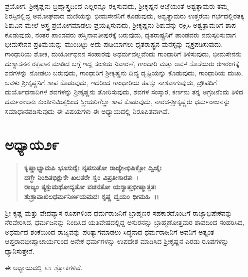 ಪ್ರಯೋಗ, ಶ‍್ರೀಕೃಷ್ಣನು ಬ್ರಹ್ಮಾಸ್ತ್ರದಿಂದ ಎಲ್ಲರನ್ನೂ ರಕ್ಷಿಸುವುದು, ಶ‍್ರೀಕೃಷ್ಣನ ಆಜ್ಞೆಯಂತೆ ಅಶ್ವತ್ಥಾಮರು ತಮ್ಮ ಶಿರಸ್ಸಿನಲ್ಲಿದ್ದ ಅಮೋಘವಾದ ಮಣಿಯನ್ನು ಭೀಮಸೇನನಿಗೆ ಕೊಡುವುದು, ಅಶ್ವತ್ಥಾಮರು ಉತ್ತರೆಯ ಗರ್ಭದಲ್ಲಿರತಕ್ಕ ಶಿಶುವಿನ ಮೇಲೆ ಅಸ್ತ್ರ ಪ್ರಯೋಗಮಾಡಲು ಪ್ರಯತ್ನಿಸುವುದು, ಶ‍್ರೀಕೃಷ್ಣನು ಶಿಶುವನ್ನು ರಕ್ಷಿಸಿ ಅಶ್ವತ್ಥಾಮರಿಗೆ ಶಾಪ ಕೊಡುವುದು, ನಂತರ ಪಾಂಡವರು ಹಸ್ತಿನಾವತೀಪುರಕ್ಕೆ ಬರುವುದು, ಧೃತರಾಷ್ಟ್ರನಿಗೆ ಪಾಂಡವರು ನಮಸ್ಕರಿಸುವಾಗ ಭೀಮಸೇನನ ಪ್ರತಿಮೆಯನ್ನು ಮುಂದಿಟ್ಟು ಅದು ಪುಡಿಯಾಗಲು ಧೃತರಾಷ್ಟ್ರನ ಮನಸ್ಸನ್ನು ವ್ಯಕ್ತಪಡಿಸುವುದು, ಗಾಂಧಾರಿಯ ಶೋಕ, ದುರ್ಯೋಧನನ ಸಂಹಾರವು ಅಧರ್ಮವಲ್ಲವೆಂದು ಗಾಂಧಾರಿಗೆ ತಿಳಿಸುವುದು, ಭೀಮಸೇನನು ದುಶ್ಯಾಸನನ ರಕ್ತಪಾನ ಮಾಡಿದ ಬಗ್ಗೆ ಇದ್ದ ಸಂಶಯ ನಿವಾರಣೆ, ಗಾಂಧಾರಿ ಮತ್ತು ಅವಳ ಸೊಸೆಯರು ರಣರಂಗಕ್ಕೆ ಶವಗಳನ್ನು ನೋಡಲು ಬರುವುದು, ಗಾಂಧಾರಿಗೆ ಶ‍್ರೀಕೃಷ್ಣನು ದಿವ್ಯ ದೃಷ್ಟಿಯನ್ನು ಕೊಡುವುದು, ಗಾಂಧಾರಿಯ ದುಃಖ, ಅವಳು ಶ‍್ರೀಕೃಷ್ಣನಿಗೆ ಶಾಪ ಕೊಡುವುದು, ಇದರಿಂದ ಗಾಂಧಾರಿಯ ತಪಸ್ಸು ನಾಶವಾಗುವುದು, ದ್ರೌಪದಿಗೆ ದುರ್ಯೊಧನಾದಿಗಳ ಶವಗಳನ್ನು ಶ‍್ರೀಕೃಷ್ಣನು ತೋರಿಸುವುದು, ಶವಗಳ ಸಂಸ್ಕಾರ, ಕರ್ಣನು ತನ್ನ ಅಗ್ರಜನೆಂದು ತಿಳಿದ ಧರ್ಮರಾಜನು ಕುಂತೀನಿಮಿತ್ತದಿಂದ ಸ್ತ್ರೀಯರಿಗೆಲ್ಲಾ ಶಾಪ ಕೊಡುವುದು, ನಾರದ-ಶ‍್ರೀಕೃಷ್ಣರು ಧರ್ಮರಾಜನನ್ನು ಸಮಾಧಾನಪಡಿಸುವುದು ಈ ವಿಷಯಗಳು ಈ ಅಧ್ಯಾಯದಲ್ಲಿ ನಿರೂಪಿತವಾಗಿವೆ.


\section*{ಅಧ್ಯಾಯ\enginline{-}೨೯}

\begin{verse}
\textbf{ಕೃಷ್ಣಾಭ್ಯಾಮಪಿ ಭೂಸುರೈಃ ನೃಪಸುತೋ ರಾಜ್ಯೇsಭಿಷಿಕ್ತೋ ದ್ವಿಜೈಃ}\\\textbf{ದಗ್ಧೇ ನಿಂದಿತಭಿಕ್ಷುಕೇ ಖಲತರೇ ಸ್ವಂ ವಿಪ್ರತೀಸಾರತಃ~।}\\\textbf{ರಾಜ್ಯಂ ತ್ಯಕ್ತುಮಥೋದ್ಯತೋ ವಚನತೋ ಯಸ್ಯಾಪ್ತಭೀಷ್ಮಾತ್ತತಃ }\\\textbf{ಶುಶ್ರಾವಾಖಿಲಧರ್ಮನಿರ್ಣಯಮದಃ ಕೃಷ್ಣ ದ್ವಯಂ ಧೀಮಹಿ~।।}
\end{verse}

ಶ‍್ರೀ ಕೃಷ್ಣ ಮತ್ತು ವೇದವ್ಯಾಸ ರೂಪಗಳಿಂದ ಧರ್ಮರಾಜನಿಗೆ ಬ್ರಾಹ್ಮಣರ ಸಹಕಾರ\-ದೊಂದಿಗೆ ರಾಜ್ಯಾಭಿಷೇಕವನ್ನು ನೆರವೇರಿಸಿದ, ಧರ್ಮಜನನ್ನು ನಿಂದಿಸಿದ ಯತಿವೇಷದಲ್ಲಿದ್ದ ಅಸುರನನ್ನು ಬ್ರಾಹ್ಮಣೋತ್ತಮರ ಶಾಪದಿಂದ ಸಂಹರಿಸಿದ, ಅಧರ್ಮದ ಶಂಕೆಯಿಂದ ರಾಜ್ಯವನ್ನು ಪರಿತ್ಯಾಗಮಾಡಲು ಸಿದ್ಧನಾದ ಧರ್ಮರಾಜನಿಗೆ ಅವನಿಗೆ ಅತ್ಯಂತ ಆಪ್ತರಾದ\break ಭೀಷ್ಮಾಚಾರ್ಯರಿಂದ ಅನೇಕ ಧರ್ಮಗಳನ್ನು ಉಪದೇಶ ಮಾಡಿಸಿದ ಶ‍್ರೀಕೃಷ್ಣನ ಎರಡು ರೂಪಗಳನ್ನು ಧ್ಯಾನಿಸುತ್ತೇನೆ.

ಈ ಅಧ್ಯಾಯದಲ್ಲಿ ೬೩ ಶ್ಲೋಕಗಳಿವೆ.


